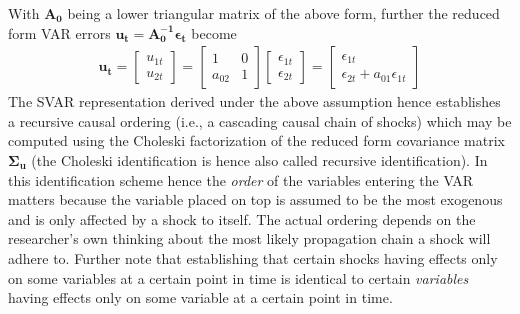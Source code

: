 \documentclass[a4paper,11pt,listof=nochaptergap,oneside,pointednumbers,bibtotoc,bigheadings,liststotoc,hidelinks]{scrbook}
\theoremstyle{mysatz}
\theoremstyle{mydefinition}
\theoremstyle{mytheorem}
\theoremstyle{mybemerkung}
\newcommand{\vect}[1]{\boldsymbol{\mathbf{#1}}}
\begin{document}
With $\vect{A_0}$ being a lower triangular matrix of the above form, further the reduced form VAR errors $\vect{u_t} = \vect{A_0^{-1}}\vect{\epsilon_t}$ become
\begin{equation} \label{eq:svar13}
\begin{split}
 		\vect{u_t} = \begin{bmatrix}
    					u_{1t} \\
					u_{2t} 
 					\end{bmatrix} = 
						\begin{bmatrix}
    						1 & 0 \\
						a_{02} & 1  
 						\end{bmatrix} 
							\begin{bmatrix}
    							\epsilon_{1t} \\
							\epsilon_{2t} 
 							\end{bmatrix} = 
								\begin{bmatrix}
    								\epsilon_{1t} \\
								\epsilon_{2t}+a_{01}\epsilon_{1t} 
 								\end{bmatrix} 			
\end{split}								
\end{equation}
The SVAR representation derived under the above assumption hence establishes a recursive causal ordering (i.e., a cascading causal chain of shocks) which may be computed using the Choleski factorization of the reduced form covariance matrix $\vect{\Sigma_u}$ (the Choleski identification is hence also called recursive identification). In this identification scheme hence the \textit{order} of the variables entering the VAR matters because the variable placed on top is assumed to be the most exogenous and is only affected by a shock to itself. The actual ordering depends on the researcher's own thinking about the most likely propagation chain a shock will adhere to. Further note that establishing that certain shocks having effects only on some variables at a certain point in time is identical to certain \textit{variables} having effects only on some variable at a certain point in time.
\end{document}

